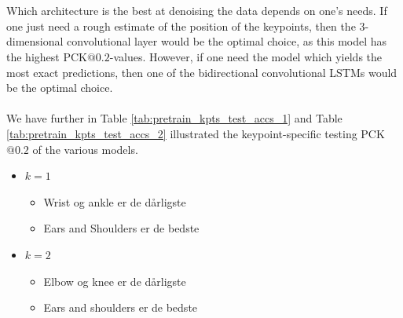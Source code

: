 \documentclass[./main.tex]{subfiles}
\begin{document}
\\
\\
Which architecture is the best at denoising the data depends on one's needs. If one just need a rough estimate of the position of the keypoints, then the 3-dimensional convolutional layer would be the optimal choice, as this model has the highest PCK$@0.2$-values. However, if one need the model which yields the most exact predictions, then one of the bidirectional convolutional LSTMs would be the optimal choice.
\\
\\
We have further in Table \ref{tab:pretrain_kpts_test_accs_1} and Table \ref{tab:pretrain_kpts_test_accs_2} illustrated the keypoint-specific testing PCK$@0.2$ of the various models.
\begin{itemize}
    \item $k = 1$
    \begin{itemize}
        \item Wrist og ankle er de dårligste
        \item Ears and Shoulders er de bedste
    \end{itemize}
    \item $k = 2$
    \begin{itemize}
        \item Elbow og knee er de dårligste
        \item Ears and shoulders er de bedste
    \end{itemize}
\end{itemize}
\end{document}
